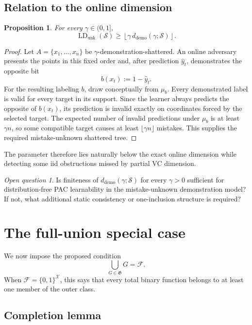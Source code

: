 \documentclass[11pt]{article}
\newtheorem{proposition}[theorem]{Proposition}
\theoremstyle{definition}
\theoremstyle{remark}
\newtheorem{question}[theorem]{Open question}
\newcommand{\X}{\mathcal X}
\newcommand{\Y}{\{0,1\}}
\newcommand{\F}{\mathcal F}
\newcommand{\Outer}{\mathfrak G}
\newcommand{\SV}{\mathcal S}
\newcommand{\LDu}{\operatorname{LD}_{\mathrm{unk}}}
\newcommand{\ddemo}{d_{\mathrm{demo}}}
\newcommand{\1}{\mathbf 1}
\begin{document}
\subsection{Relation to the online dimension}

\begin{proposition}
For every $\gamma\in(0,1]$,
\[
    \LDu(\SV)
    \geq
    \left\lfloor\gamma\,\ddemo(\gamma;\SV)\right\rfloor.
\]
\end{proposition}

\begin{proof}
Let $A=\{x_1,\ldots,x_n\}$ be $\gamma$-demonstration-shattered. An online adversary presents the points in this fixed order and, after prediction $\widehat y_t$, demonstrates the opposite bit
\[
    b(x_t):=1-\widehat y_t.
\]
For the resulting labeling $b$, draw conceptually from $\mu_b$. Every demonstrated label is valid for every target in its support. Since the learner always predicts the opposite of $b(x_t)$, its prediction is invalid exactly on coordinates forced by the selected target. The expected number of invalid predictions under $\mu_b$ is at least $\gamma n$, so some compatible target causes at least $\lfloor\gamma n\rfloor$ mistakes. This supplies the required mistake-unknown shattered tree.
\end{proof}

The parameter therefore lies naturally below the exact online dimension while detecting some iid obstructions missed by partial VC dimension.

\begin{question}
Is finiteness of $\ddemo(\gamma;\SV)$ for every $\gamma>0$ sufficient for distribution-free PAC learnability in the mistake-unknown demonstration model? If not, what additional static consistency or one-inclusion structure is required?
\end{question}

\section{The full-union special case}

We now impose the proposed condition
\[
    \bigcup_{G\in\Outer}G=\F.
\]
When $\F=\Y^{\X}$, this says that every total binary function belongs to at least one member of the outer class.

\subsection{Completion lemma}
\end{document}
